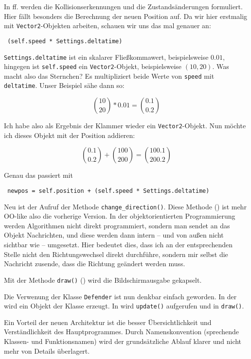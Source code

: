 In ff. werden die Kollisionserkennungen und die Zustandsänderungen formuliert. Hier fällt besonders die Berechnung der neuen Position auf. Da wir hier erstmalig mit \texttt{Vector2}-Objekten arbeiten, schauen wir uns das mal genauer an:

\texttt{ (self.speed * Settings.deltatime)}

\texttt{Settings.deltatime} ist ein skalarer Fließkommawert, beispielsweise $0.01$, hingegen ist \texttt{self.speed} ein \texttt{Vector2}-Objekt, beispielsweise $(10, 20)$. Was macht also das Sternchen? Es multipliziert beide Werte von \texttt{speed} mit \texttt{deltatime}. Unser Beispiel sähe dann so:

\[ {10 \choose 20} * 0.01 = {0.1 \choose 0.2} \]

Ich habe also als Ergebnis der Klammer wieder ein \texttt{Vector2}-Objekt. Nun möchte ich dieses Objekt mit der Position addieren:

\[ {0.1 \choose 0.2} + {100 \choose 200} =  {100.1 \choose 200.2}\]

Genau das passiert mit 

\texttt{ newpos = self.position + (self.speed * Settings.deltatime)}

Neu ist der Aufruf der Methode \texttt{change\_direction()}. Diese Methode () ist mehr OO-like also die vorherige Version. In der objektorientierten Programmierung werden Algorithmen nicht direkt programmiert, sondern man sendet an das Objekt Nachrichten, und diese werden dann intern -- und von außen nicht sichtbar wie -- umgesetzt. Hier bedeutet dies, dass ich an der entsprechenden Stelle nicht den Richtungswechsel direkt durchführe, sondern mir selbst die Nachricht zusende, dass die Richtung geändert werden muss. 

Mit der Methode \texttt{draw()} () wird die Bildschirmausgabe gekapselt.


Die Verwenung der Klasse \texttt{Defender} ist nun denkbar einfach geworden. In der  wird ein Objekt der Klasse erzeugt. In  wird \texttt{update()} aufgerufen und in  \texttt{draw()}.

Ein Vorteil der neuen Architektur ist die besser Übersichtlichkeit und Verständlichkeit des Hauptprogrammes. Durch Namenskonvention (sprechende Klassen- und Funktionsnamen) wird der grundsätzliche Ablauf klarer und nicht mehr von Details überlagert.



